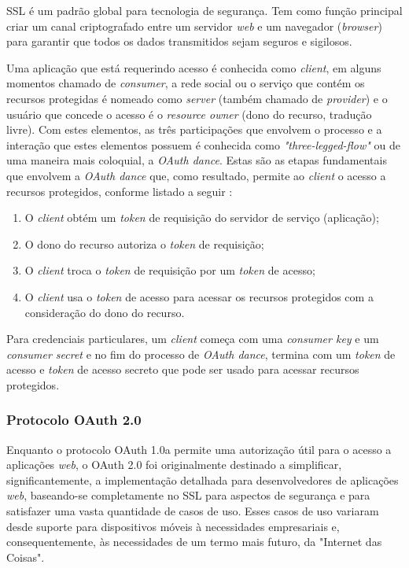 SSL é um padrão global para tecnologia de segurança. Tem como função principal criar um canal criptografado entre um servidor \textit{web} e um navegador (\textit{browser}) para garantir que todos os dados transmitidos sejam seguros e sigilosos.

Uma aplicação que está requerindo acesso é conhecida como \textit{client}, em alguns momentos chamado de \textit{consumer}, a rede social ou o serviço que contém os recursos protegidas é nomeado como \textit{server} (também chamado de \textit{provider}) e o usuário que concede o acesso é o \textit{resource owner} (dono do recurso, tradução livre). Com estes elementos, as três participações que envolvem o processo e a interação que estes elementos possuem é conhecida como \textit{"three-legged-flow"} ou de uma maneira mais coloquial, a \textit{OAuth dance}. Estas são as etapas fundamentais que envolvem a \textit{OAuth dance} que, como resultado, permite ao \textit{client} o acesso a recursos protegidos, conforme listado a seguir \cite{mining-social-web}:

\begin{enumerate}
	\item O \textit{client} obtém um \textit{token} de requisição do servidor de serviço (aplicação);
	\item O dono do recurso autoriza o \textit{token} de requisição;
	\item O \textit{client} troca o \textit{token} de requisição por um \textit{token} de acesso;
	\item O \textit{client} usa o \textit{token} de acesso para acessar os recursos protegidos com a consideração do dono do recurso.
\end{enumerate}

Para credenciais particulares, um \textit{client} começa com uma \textit{consumer key} e um \textit{consumer secret} e no fim do processo de \textit{OAuth dance}, termina com um \textit{token} de acesso e \textit{token} de acesso secreto que pode ser usado para acessar recursos protegidos.

\subsubsection{Protocolo OAuth 2.0}
Enquanto o protocolo OAuth 1.0a permite uma autorização útil para o acesso a aplicações \textit{web}, o OAuth 2.0 foi originalmente destinado a simplificar, significantemente, a implementação detalhada para desenvolvedores de aplicações \textit{web}, baseando-se completamente no SSL para aspectos de segurança e para satisfazer uma vasta quantidade de casos de uso. Esses casos de uso variaram desde suporte para dispositivos móveis à necessidades empresariais e, consequentemente, às necessidades de um termo mais futuro, da "Internet das Coisas"\space \cite{mining-social-web}.

